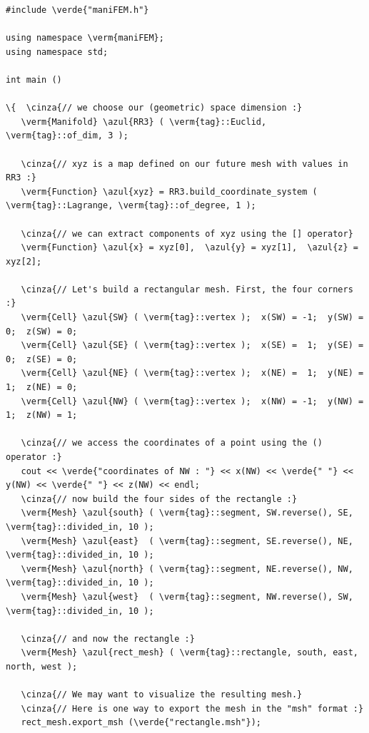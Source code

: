 \begin{Verbatim}[commandchars=\\\{\},formatcom=\small\tt,frame=single,
   label=main-\ref{\numb section 1.\numb parag 1}.cpp,rulecolor=\color{coment},
   baselinestretch=0.94,framesep=2mm                                            ]
#include \verde{"maniFEM.h"}

using namespace \verm{maniFEM};
using namespace std;

int main ()

\{  \cinza{// we choose our (geometric) space dimension :}
   \verm{Manifold} \azul{RR3} ( \verm{tag}::Euclid, \verm{tag}::of_dim, 3 );
   
   \cinza{// xyz is a map defined on our future mesh with values in RR3 :}
   \verm{Function} \azul{xyz} = RR3.build_coordinate_system ( \verm{tag}::Lagrange, \verm{tag}::of_degree, 1 );

   \cinza{// we can extract components of xyz using the [] operator}
   \verm{Function} \azul{x} = xyz[0],  \azul{y} = xyz[1],  \azul{z} = xyz[2];

   \cinza{// Let's build a rectangular mesh. First, the four corners :}
   \verm{Cell} \azul{SW} ( \verm{tag}::vertex );  x(SW) = -1;  y(SW) = 0;  z(SW) = 0;
   \verm{Cell} \azul{SE} ( \verm{tag}::vertex );  x(SE) =  1;  y(SE) = 0;  z(SE) = 0;
   \verm{Cell} \azul{NE} ( \verm{tag}::vertex );  x(NE) =  1;  y(NE) = 1;  z(NE) = 0;
   \verm{Cell} \azul{NW} ( \verm{tag}::vertex );  x(NW) = -1;  y(NW) = 1;  z(NW) = 1;
   
   \cinza{// we access the coordinates of a point using the () operator :}								
   cout << \verde{"coordinates of NW : "} << x(NW) << \verde{" "} << y(NW) << \verde{" "} << z(NW) << endl;
   \cinza{// now build the four sides of the rectangle :}
   \verm{Mesh} \azul{south} ( \verm{tag}::segment, SW.reverse(), SE, \verm{tag}::divided_in, 10 );
   \verm{Mesh} \azul{east}  ( \verm{tag}::segment, SE.reverse(), NE, \verm{tag}::divided_in, 10 );
   \verm{Mesh} \azul{north} ( \verm{tag}::segment, NE.reverse(), NW, \verm{tag}::divided_in, 10 );
   \verm{Mesh} \azul{west}  ( \verm{tag}::segment, NW.reverse(), SW, \verm{tag}::divided_in, 10 );
   
   \cinza{// and now the rectangle :}
   \verm{Mesh} \azul{rect_mesh} ( \verm{tag}::rectangle, south, east, north, west );

   \cinza{// We may want to visualize the resulting mesh.}
   \cinza{// Here is one way to export the mesh in the "msh" format :}
   rect_mesh.export_msh (\verde{"rectangle.msh"});


\end{Verbatim}
